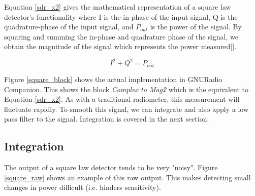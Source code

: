 Equation \ref{sdr_x2} gives the mathematical representation of a square law detector's functionality where I is the in-phase of the input signal, Q is the quadrature-phase of the input signal, and $P_{out}$ is the power of the signal.  By squaring and summing the in-phase and quadrature phase of the signal, we obtain the magnitude of the signal which represents the power measured[\cite{Rashid}].  



\begin{equation}\label{sdr_x2}
I^2+Q^2 = P_{out}
\end{equation}

Figure \ref{square_block} shows the actual implementation in GNURadio Companion.  This shows the block \emph{Complex to Mag\^2} which is the equivalent to Equation \ref{sdr_x2}.  As with a traditional radiometer, this measurement will fluctuate rapidly.  To smooth this signal, we can integrate and also apply a low pass filter to the signal.  Integration is covered in the next section.


\subsection{Integration}

The output of a square law detector tends to be very "noisy".  Figure \ref{square_raw} shows an example of this raw output.  This makes detecting small changes in power difficult (i.e. hinders sensitivity).  

